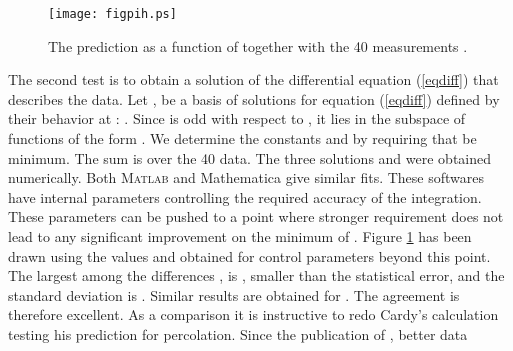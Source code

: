 \documentclass[a4paper,12pt]{article}
\begin{document}
\begin{figure}
\begin{center}\leavevmode
\texttt{[image: figpih.ps]}
\end{center}
\caption{The prediction \coordHE{} as a function of \coordHE{} together
with the 40 measurements \coordHE{}.\label{fig:pih}}
\end{figure}



The second test is to obtain a solution of the differential equation
(\ref{eqdiff}) that describes the data. Let \coordHE{}, be
a basis of solutions for
equation (\ref{eqdiff}) defined by their behavior at \coordHE{}:
\coordHE{}. Since \coordHE{}
is odd with respect to \coordHE{}, it lies in the subspace 
of functions of the form \coordHE{}. We determine the constants
\coordHE{} and \coordHE{} by requiring that \coordHE{}
be minimum. The sum is over the 40 data. The three solutions \coordHE{} and \coordHE{} were obtained numerically. 
Both {\scshape Matlab} %
and Mathematica %
give similar fits. These softwares have internal parameters controlling
the required accuracy of the integration. These parameters
can be pushed to a point where stronger
requirement does not lead to any significant improvement on the minimum of
\coordHE{}. Figure \ref{fig:pih} has been drawn using the values \coordHE{} and \coordHE{} 
obtained for control parameters beyond this point. The largest among the
differences \coordHE{}, is
\coordHE{}, smaller than the statistical error, and the
standard deviation is \coordHE{}. Similar results are obtained for
\coordHE{}. The agreement is therefore excellent. As a comparison it is
instructive to redo Cardy's calculation testing his prediction for
percolation. Since the publication of \cite{Cardyperco}, better data
\end{document}
